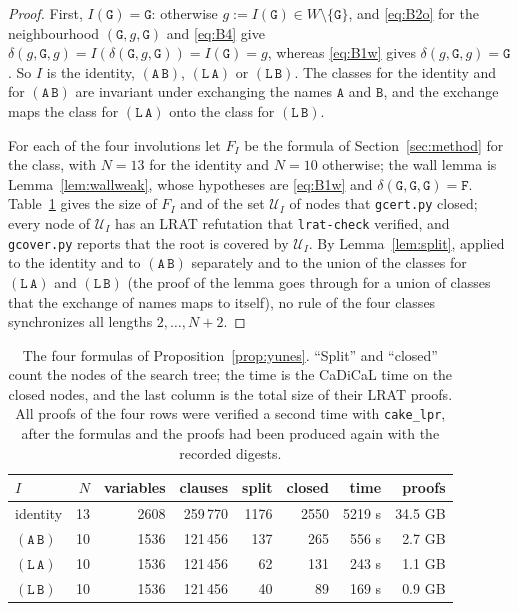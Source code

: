 \documentclass[11pt]{article}
\theoremstyle{remark}
\newcommand{\Lq}{\mathtt{L}}\newcommand{\Gq}{\mathtt{G}}\newcommand{\Aq}{\mathtt{A}}\newcommand{\Bq}{\mathtt{B}}\newcommand{\Fq}{\mathtt{F}}
\begin{document}
\begin{proof}
First, $I(\Gq)=\Gq$: otherwise $g:=I(\Gq)\in W\setminus\{\Gq\}$, and \eqref{eq:B2o} for the neighbourhood
$(\Gq,g,\Gq)$ and \eqref{eq:B4} give $\delta(g,\Gq,g)=I(\delta(\Gq,g,\Gq))=I(\Gq)=g$, whereas \eqref{eq:B1w}
gives $\delta(g,\Gq,g)=\Gq$. So $I$ is the identity, $(\Aq\,\Bq)$, $(\Lq\,\Aq)$ or $(\Lq\,\Bq)$. The classes for
the identity and for $(\Aq\,\Bq)$ are invariant under exchanging the names $\Aq$ and $\Bq$, and the exchange
maps the class for $(\Lq\,\Aq)$ onto the class for $(\Lq\,\Bq)$.

For each of the four involutions let $F_I$ be the formula of Section~\ref{sec:method} for the class, with
$N=13$ for the identity and $N=10$ otherwise; the wall lemma is Lemma~\ref{lem:wallweak}, whose hypotheses are
\eqref{eq:B1w} and $\delta(\Gq,\Gq,\Gq)=\Fq$. Table~\ref{tab:yunes} gives the size of $F_I$ and of the set
$\mathcal U_I$ of nodes that \texttt{gcert.py} closed; every node of $\mathcal U_I$ has an LRAT refutation
that \texttt{lrat-check} verified, and \texttt{gcover.py} reports that the root is covered by
$\mathcal U_I$. By Lemma~\ref{lem:split}, applied to the identity and to $(\Aq\,\Bq)$ separately and to the
union of the classes for $(\Lq\,\Aq)$ and $(\Lq\,\Bq)$ (the proof of the lemma goes through for a union of
classes that the exchange of names maps to itself), no rule of the four classes synchronizes all lengths
$2,\dots,N+2$.
\end{proof}

\begin{table}[ht]
\centering\small
\caption{The four formulas of Proposition~\ref{prop:yunes}. ``Split'' and ``closed'' count the nodes of the
search tree; the time is the CaDiCaL time on the closed nodes, and the last column is the total size of their
LRAT proofs. All proofs of the four rows were verified a second time with \texttt{cake\_lpr}, after the
formulas and the proofs had been produced again with the recorded digests.}\label{tab:yunes}
\begin{tabular}{lrrrrrrr}
\toprule
$I$ & $N$ & variables & clauses & split & closed & time & proofs\\
\midrule
identity & 13 & 2608 & 259\,770 & 1176 & 2550 & 5219 s & 34.5 GB\\
$(\Aq\,\Bq)$ & 10 & 1536 & 121\,456 & 137 & 265 & 556 s & 2.7 GB\\
$(\Lq\,\Aq)$ & 10 & 1536 & 121\,456 & 62 & 131 & 243 s & 1.1 GB\\
$(\Lq\,\Bq)$ & 10 & 1536 & 121\,456 & 40 & 89 & 169 s & 0.9 GB\\
\bottomrule
\end{tabular}
\end{table}
\end{document}
